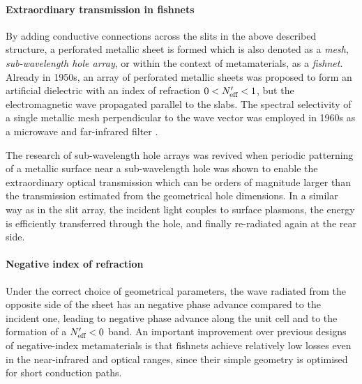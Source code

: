 \paragraph{Extraordinary transmission in fishnets} %
By adding conductive connections across the slits in the above described structure, a perforated metallic sheet is formed which is also denoted as a \textit{mesh}, \textit{sub-wavelength hole array}, or within the context of metamaterials, as a \textit{fishnet}. Already in 1950s, an array of perforated metallic sheets was proposed to form an artificial dielectric \cite[p. 58]{brown1953artificial} with an index of refraction $0 < N_{\text{eff} }' < 1$, but the electromagnetic wave propagated parallel to the slabs.  %
The spectral selectivity of a single metallic mesh perpendicular to the wave vector was employed in 1960s as a microwave and far-infrared filter \cite{ulrich1967effective,ulrich1967far, vogel1964transmission}.  

The research of sub-wavelength hole arrays was revived when periodic patterning of a metallic surface near a sub-wavelength hole was shown  \cite{ebbesen1998extraordinary} to enable the extraordinary optical transmission which can be orders of magnitude larger than the transmission estimated from the geometrical hole dimensions. 
In a similar way as in the slit array, the incident light couples to surface plasmons, the energy is efficiently transferred through the hole, and finally re-radiated again at the rear side. 


\paragraph{Negative index of refraction}%
Under the correct choice of geometrical parameters, the wave radiated from the opposite side of the sheet has an negative phase advance compared to the incident one, leading to negative phase advance along the unit cell and to the formation of a $N_{\text{eff} }'<0$ band. 
An important improvement over previous designs of negative-index metamaterials is that fishnets achieve relatively low losses even in the near-infrared and optical ranges, since their simple geometry is optimised for short conduction paths.

